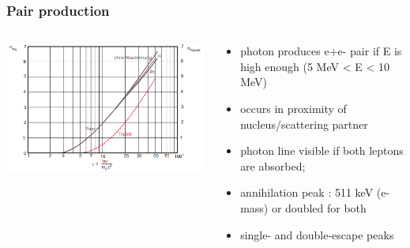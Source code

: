 \documentclass[aspectratio=1610, 12pt]{beamer}
\begin{document}
\begin{frame}\frametitle{Pair production}
  \begin{columns}
    \begin{column}[c]{0.48\textwidth}
      \includegraphics[width=\textwidth]{plots/pair_triplett.png}
    \end{column}
    \begin{column}[c]{0.48\textwidth}
      \begin{itemize}
        \item photon produces e+e- pair if E is high enough (5 MeV < E < 10 MeV)
        \item occurs in proximity of nucleus/scattering partner
        \item photon line visible if both leptons are absorbed;
        \item annihilation peak : 511 keV (e- mass) or doubled for both
        \item single- and double-escape peaks
      \end{itemize}
    \end{column}
  \end{columns}
\end{frame}
\end{document}
